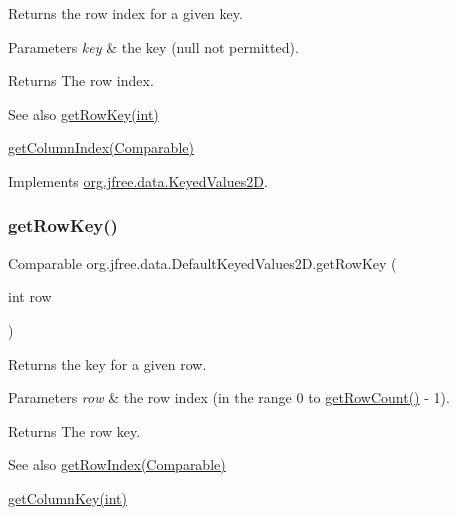 Returns the row index for a given key.


\begin{DoxyParams}{Parameters}
{\em key} & the key ({\ttfamily null} not permitted).\\
\hline
\end{DoxyParams}
\begin{DoxyReturn}{Returns}
The row index.
\end{DoxyReturn}
\begin{DoxySeeAlso}{See also}
\mbox{\hyperlink{classorg_1_1jfree_1_1data_1_1_default_keyed_values2_d_ada2ab1693bba62c0f8a8d5e046614b59}{get\+Row\+Key(int)}} 

\mbox{\hyperlink{classorg_1_1jfree_1_1data_1_1_default_keyed_values2_d_a7850b37a7f84b089906f1713b6fef6f0}{get\+Column\+Index(\+Comparable)}} 
\end{DoxySeeAlso}


Implements \mbox{\hyperlink{interfaceorg_1_1jfree_1_1data_1_1_keyed_values2_d_ae92ded12999f2872687a5754ddf29254}{org.\+jfree.\+data.\+Keyed\+Values2D}}.

\mbox{\label{classorg_1_1jfree_1_1data_1_1_default_keyed_values2_d_ada2ab1693bba62c0f8a8d5e046614b59}} 
\subsubsection{\texorpdfstring{get\+Row\+Key()}{getRowKey()}}
{\footnotesize\ttfamily Comparable org.\+jfree.\+data.\+Default\+Keyed\+Values2\+D.\+get\+Row\+Key (\begin{DoxyParamCaption}\item[{int}]{row }\end{DoxyParamCaption})}

Returns the key for a given row.


\begin{DoxyParams}{Parameters}
{\em row} & the row index (in the range 0 to \mbox{\hyperlink{classorg_1_1jfree_1_1data_1_1_default_keyed_values2_d_aaa4f83398caf1c5a2e59e719d72de13f}{get\+Row\+Count()}} -\/ 1).\\
\hline
\end{DoxyParams}
\begin{DoxyReturn}{Returns}
The row key.
\end{DoxyReturn}
\begin{DoxySeeAlso}{See also}
\mbox{\hyperlink{classorg_1_1jfree_1_1data_1_1_default_keyed_values2_d_aaca2e39352630d0f49c45a09b8a106e6}{get\+Row\+Index(\+Comparable)}} 

\mbox{\hyperlink{classorg_1_1jfree_1_1data_1_1_default_keyed_values2_d_af2df339aaadf2c30c6fb2e331a69c39c}{get\+Column\+Key(int)}} 
\end{DoxySeeAlso}


